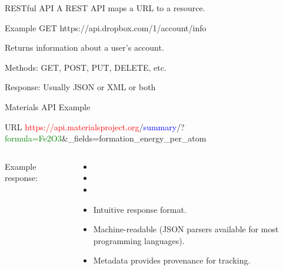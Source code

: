 \documentclass[aspectratio=169]{beamer}
\begin{document}
    \begin{frame}{RESTful API}
        A REST API maps a URL to a resource.
        \begin{exampleblock}{Example}
            GET https://api.dropbox.com/1/account/info
        \end{exampleblock}
        Returns information about a user’s account.

        Methods: GET, POST, PUT, DELETE, etc.

        Response: Usually JSON or XML or both
    \end{frame}


    \begin{frame}{Materials API Example}
        \begin{exampleblock}{URL}
            \footnotesize
            \textcolor{red}{https://api.materialsproject.org}/\textcolor{blue}{summary}/?\textcolor{green}{formula=Fe2O3}\&\_fields=formation\_energy\_per\_atom\\
        \end{exampleblock}
        \begin{columns}
            Example response:
            \inputminted{json}{mapi_response.txt}
            \begin{itemize}
                \item[]
                \item[]
                \item[]
                \item Intuitive response format.
                \item Machine-readable (JSON parsers available for most programming languages).
                \item Metadata provides provenance for tracking.
            \end{itemize}
        \end{columns}
    \end{frame}
\end{document}
